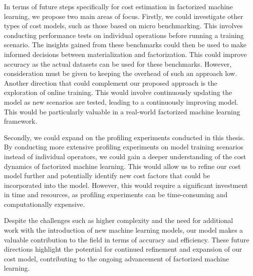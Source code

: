 In terms of future steps specifically for cost estimation in factorized machine learning, we propose two main areas of focus. Firstly, we could investigate other types of cost models, such as those based on micro benchmarking. This involves conducting performance tests on individual operations before running a training scenario. The insights gained from these benchmarks could then be used to make informed decisions between materialization and factorization. This could improve accuracy as the actual datasets can be used for these benchmarks. However, consideration must be given to keeping the overhead of such an approach low. Another direction that could complement our proposed approach is the exploration of online training. This would involve continuously updating the model as new scenarios are tested, leading to a continuously improving model. This would be particularly valuable in a real-world factorized machine learning framework.

Secondly, we could expand on the profiling experiments conducted in this thesis. By conducting more extensive profiling experiments on model training scenarios instead of individual operators, we could gain a deeper understanding of the cost dynamics of factorized machine learning. This would allow us to refine our cost model further and potentially identify new cost factors that could be incorporated into the model. However, this would require a significant investment in time and resources, as profiling experiments can be time-consuming and computationally expensive.

Despite the challenges such as higher complexity and the need for additional work with the introduction of new machine learning models, our model makes a valuable contribution to the field in terms of accuracy and efficiency. These future directions highlight the potential for continued refinement and expansion of our cost model, contributing to the ongoing advancement of factorized machine learning.